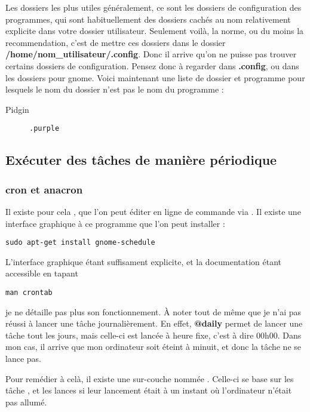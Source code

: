 \documentclass[a4paper,twoside]{article}
\begin{document}
Les dossiers les plus utiles généralement, ce sont les dossiers de configuration des programmes, qui sont habituellement des dossiers cachés au nom relativement explicite dans votre dossier utilisateur. Seulement voilà, la norme, ou du moins la recommendation, c'est de mettre ces dossiers dans le dossier \textbf{/home/nom\_utilisateur/.config}. Donc il arrive qu'on ne puisse pas trouver certains dossiers de configuration. Pensez donc à regarder dans \textbf{.config}, ou dans les dossiers pour gnome. Voici maintenant une liste de dossier et programme pour lesquels le nom du dossier n'est pas le nom du programme :

\begin{description}
\item[Pidgin] \verb|.purple|
\end{description}

\subsection{Exécuter des tâches de manière périodique}
\subsubsection{cron et anacron}\label{sec:cron}

Il existe pour cela , que l'on peut éditer en ligne de commande via . Il existe une interface graphique à ce programme que l'on peut installer :

\begin{verbatim}
sudo apt-get install gnome-schedule
\end{verbatim}

L'interface graphique étant suffisament explicite, et la documentation étant accessible en tapant

\begin{verbatim}
man crontab
\end{verbatim}

je ne détaille pas plus son fonctionnement. À noter tout de même que je n'ai pas réussi à lancer une tâche journalièrement. En effet, \textbf{@daily} permet de lancer une tâche tout les jours, mais celle-ci est lancée à heure fixe, c'est à dire 00h00. Dans mon cas, il arrive que mon ordinateur soit éteint à minuit, et donc la tâche ne se lance pas.

Pour remédier à celà, il existe une \og sur-couche \fg nommée . Celle-ci se base sur les tâche , et les lances si leur lancement était à un instant où l'ordinateur n'était pas allumé.
\end{document}
